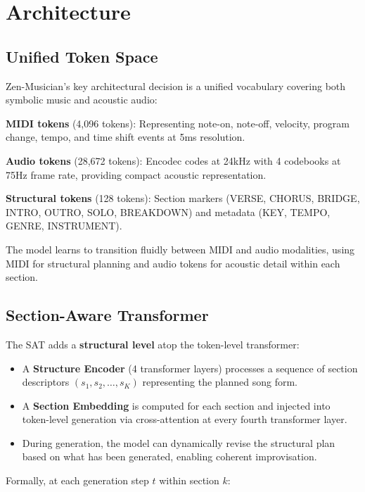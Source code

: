 \documentclass[11pt,a4paper]{article}
\begin{document}
\section{Architecture}

\subsection{Unified Token Space}

Zen-Musician's key architectural decision is a unified vocabulary covering both symbolic music
and acoustic audio:

\textbf{MIDI tokens} (4,096 tokens): Representing note-on, note-off, velocity, program change,
tempo, and time shift events at 5ms resolution.

\textbf{Audio tokens} (28,672 tokens): Encodec \cite{defossez2022encodec} codes at 24kHz with
4 codebooks at 75Hz frame rate, providing compact acoustic representation.

\textbf{Structural tokens} (128 tokens): Section markers (VERSE, CHORUS, BRIDGE, INTRO,
OUTRO, SOLO, BREAKDOWN) and metadata (KEY, TEMPO, GENRE, INSTRUMENT).

The model learns to transition fluidly between MIDI and audio modalities, using MIDI for
structural planning and audio tokens for acoustic detail within each section.

\subsection{Section-Aware Transformer}

The SAT adds a \textbf{structural level} atop the token-level transformer:

\begin{itemize}
    \item A \textbf{Structure Encoder} (4 transformer layers) processes a sequence of section
    descriptors $(s_1, s_2, \ldots, s_K)$ representing the planned song form.
    \item A \textbf{Section Embedding} is computed for each section and injected into token-level
    generation via cross-attention at every fourth transformer layer.
    \item During generation, the model can dynamically revise the structural plan based on
    what has been generated, enabling coherent improvisation.
\end{itemize}

Formally, at each generation step $t$ within section $k$:
\end{document}
